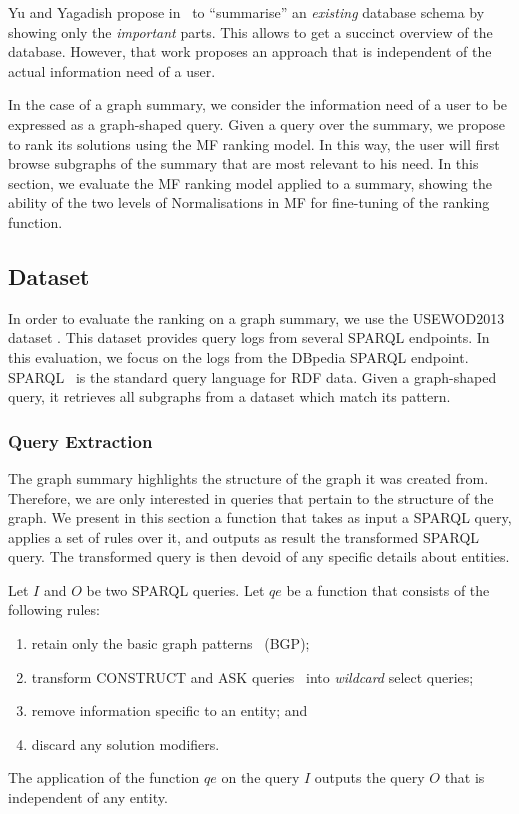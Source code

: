 Yu and Yagadish propose in~\cite{yu:2006:schema-summarization} to ``summarise'' an \emph{existing} database schema by showing only the \emph{important} parts. This allows to get a succinct overview of the database.
However, that work proposes an approach that is independent of the actual information need of a user.

In the case of a graph summary, we consider the information need of a user to be expressed as a graph-shaped query. Given a query over the summary, we propose to rank its solutions using the MF ranking model. In this way, the user will first browse subgraphs of the summary that are most relevant to his need. In this section, we evaluate the MF ranking model applied to a summary, showing the ability of the two levels of Normalisations in MF for fine-tuning of the ranking function.

\subsection{Dataset}
\label{sec:summary-ranking:dataset}

In order to evaluate the ranking on a graph summary, we use the USEWOD2013 dataset \cite{usewod:2013}. This dataset provides query logs from several SPARQL endpoints. In this evaluation, we focus on the logs from the DBpedia SPARQL endpoint. SPARQL~\cite{PrudS08} is the standard query language for RDF data. Given a graph-shaped query, it retrieves all subgraphs from a dataset which match its pattern.

\subsubsection{Query Extraction}

The graph summary highlights the structure of the graph it was created from. Therefore, we are only interested in queries that pertain to the structure of the graph. We present in this section a function that takes as input a SPARQL query, applies a set of rules over it, and outputs as result the transformed SPARQL query. The transformed query is then devoid of any specific details about entities.

\begin{definition}
Let $I$ and $O$ be two SPARQL queries. Let $qe$ be a function that consists of the following rules:
\begin{enumerate}
	\item retain only the basic graph patterns~\cite{PrudS08} (BGP);
	\item transform CONSTRUCT and ASK queries~\cite{PrudS08} into \emph{wildcard} select queries;
	\item remove information specific to an entity; and
	\item discard any solution modifiers.
\end{enumerate}
The application of the function $qe$ on the query $I$ outputs the query $O$ that is independent of any entity.
\label{def:query-extraction-function}
\end{definition}

